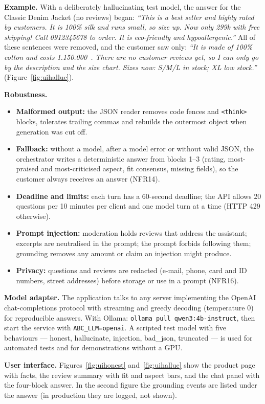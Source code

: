 \textbf{Example.} With a deliberately hallucinating test model, the answer for the Classic Denim Jacket (no reviews) began: \emph{``This is a best seller and highly rated by customers. It is 100\% silk and runs small, so size up. Now only 299k with free shipping! Call 0912345678 to order. It is eco-friendly and hypoallergenic.''} All of these sentences were removed, and the customer saw only: \emph{``It is made of 100\% cotton and costs 1.150.000~\underline{\dj}. There are no customer reviews yet, so I can only go by the description and the size chart. Sizes now: S/M/L in stock; XL low stock.''} (Figure~\ref{fig:uihalluc}).

\textbf{Robustness.}
\begin{itemize}
  \item \textbf{Malformed output:} the JSON reader removes code fences and \texttt{<think>} blocks, tolerates trailing commas and rebuilds the outermost object when generation was cut off.
  \item \textbf{Fallback:} without a model, after a model error or without valid JSON, the orchestrator writes a deterministic answer from blocks 1--3 (rating, most-praised and most-criticised aspect, fit consensus, missing fields), so the customer always receives an answer (NFR14).
  \item \textbf{Deadline and limits:} each turn has a 60-second deadline; the API allows 20 questions per 10 minutes per client and one model turn at a time (HTTP 429 otherwise).
  \item \textbf{Prompt injection:} moderation holds reviews that address the assistant; excerpts are neutralised in the prompt; the prompt forbids following them; grounding removes any amount or claim an injection might produce.
  \item \textbf{Privacy:} questions and reviews are redacted (e-mail, phone, card and ID numbers, street addresses) before storage or use in a prompt (NFR16).
\end{itemize}

\textbf{Model adapter.} The application talks to any server implementing the OpenAI chat-completions protocol with streaming and greedy decoding (temperature 0) for reproducible answers. With Ollama: \texttt{ollama pull qwen3:4b-instruct}, then start the service with \texttt{ABC\_LLM=openai}. A scripted test model with five behaviours --- honest, hallucinate, injection, bad\_json, truncated --- is used for automated tests and for demonstrations without a GPU.

\textbf{User interface.} Figures~\ref{fig:uihonest} and~\ref{fig:uihalluc} show the product page with facts, the review summary with fit and aspect bars, and the chat panel with the four-block answer. In the second figure the grounding events are listed under the answer (in production they are logged, not shown).


